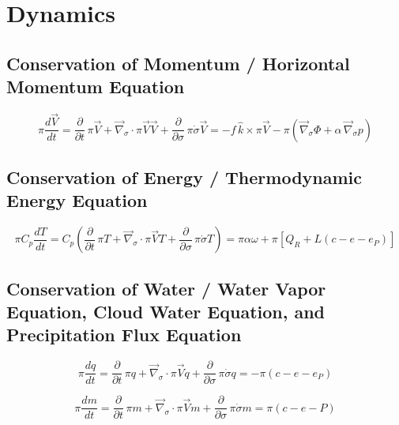 \documentclass[12pt,openany]{book}
\begin{document}
\chapter{Dynamics}

\section{Conservation of Momentum / Horizontal Momentum Equation}

\begin{equation}
\pi \frac{d \vec{V}}{d t}
=
\frac{\partial}{\partial t} \, \pi \vec{V}
+
\vec{\nabla}_{\sigma} \cdot \pi \vec{V} \vec{V}
+
\frac{\partial}{\partial \sigma} \, \pi \dot{\sigma} \vec{V}
=
-
f \, \hat{k} \times \pi \vec{V}
-
\pi \left(
\vec{\nabla}_{\sigma} \Phi
+
\alpha \, \vec{\nabla}_{\sigma} p
\right)
\tag{6.1}
\label{eq:6.1}
\end{equation}

\section{Conservation of Energy / Thermodynamic Energy Equation}

\begin{equation}
\pi C_p \frac{d T}{d t}
=
C_p \left(
\frac{\partial}{\partial t} \, \pi T
+
\vec{\nabla}_{\sigma} \cdot \pi \vec{V} T
+
\frac{\partial}{\partial \sigma} \, \pi \dot{\sigma} T
\right)
=
\pi \alpha \omega
+
\pi \left[
Q_R
+
L (c - e - e_P)
\right]
\tag{6.2}
\label{eq:6.2}
\end{equation}

\section{Conservation of Water / Water Vapor Equation, Cloud Water Equation,
and Precipitation Flux Equation}

\begin{equation}
\pi \frac{d q}{d t}
=
\frac{\partial}{\partial t} \, \pi q
+
\vec{\nabla}_{\sigma} \cdot \pi \vec{V} q
+
\frac{\partial}{\partial \sigma} \, \pi \dot{\sigma} q
=
-
\pi (c - e - e_P)
\tag{6.3}
\label{eq:6.3}
\end{equation}

\begin{equation}
\pi \frac{d m}{d t}
=
\frac{\partial}{\partial t} \, \pi m
+
\vec{\nabla}_{\sigma} \cdot \pi \vec{V} m
+
\frac{\partial}{\partial \sigma} \, \pi \dot{\sigma} m
=
\pi (c - e - P)
\tag{6.4}
\label{eq:6.4}
\end{equation}
\end{document}
